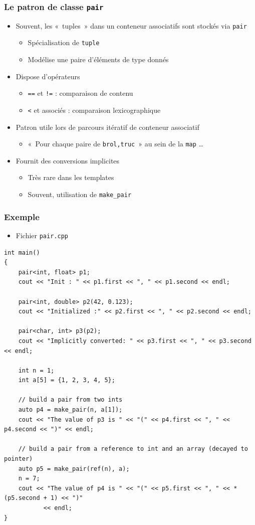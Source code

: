\begin{frame}
\frametitle{Le patron de classe \texttt{pair}}
\begin{itemize}[<+->]
\item Souvent, les «~tuples~» dans un conteneur associatifs sont stockés via \texttt{pair}
	\begin{itemize}
	\item Spécialisation de \texttt{tuple}
	\item Modélise une paire d'éléments de type donnés
	\end{itemize}	
\item Dispose d'opérateurs
	\begin{itemize}
	\item \texttt{==} et \texttt{!=} : comparaison de contenu
	\item \texttt{<} et associés : comparaison lexicographique
	\end{itemize}
\item Patron utile lors de parcours itératif de conteneur associatif
	\begin{itemize}
	\item «~Pour chaque paire de \texttt{brol,truc}~» au sein de la \texttt{map} \dots
	\end{itemize}
\item Fournit des conversions implicites
	\begin{itemize}
	\item Très rare dans les templates
	\item Souvent, utilisation de \lstinline|make_pair|
	\end{itemize}
\end{itemize}
\end{frame}

\begin{frame}[containsverbatim]
\frametitle{Exemple}
\begin{itemize}
\item Fichier \texttt{pair.cpp}
\end{itemize}
\begin{lstlisting}
int main()
{
	pair<int, float> p1;
	cout << "Init : " << p1.first << ", " << p1.second << endl;
 
	pair<int, double> p2(42, 0.123);
	cout << "Initialized :" << p2.first << ", " << p2.second << endl;
 
	pair<char, int> p3(p2);
	cout << "Implicitly converted: " << p3.first << ", " << p3.second << endl;

	int n = 1;
	int a[5] = {1, 2, 3, 4, 5};
 
	// build a pair from two ints
	auto p4 = make_pair(n, a[1]);
	cout << "The value of p3 is " << "(" << p4.first << ", " << p4.second << ")" << endl;
 
	// build a pair from a reference to int and an array (decayed to pointer)
	auto p5 = make_pair(ref(n), a);
	n = 7;
	cout << "The value of p4 is " << "(" << p5.first << ", " << *(p5.second + 1) << ")" 
		   << endl;
}
\end{lstlisting}
\end{frame}

